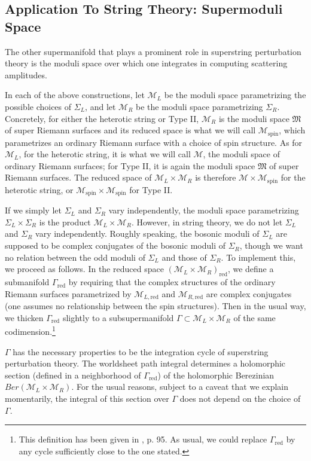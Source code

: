 \documentclass[11pt,a4paper]{article}
\def\SIgma{\Sigma}
\def\red{{\mathrm{red}}}
\def\spin{{\mathrm{spin}}}
\def\M{{\mathcal M}}
\def\MM{{\mathfrak M}}
\begin{document}
\subsection{Application To String Theory: Supermoduli Space}\label{applimoduli}

The other supermanifold that plays a prominent role in superstring perturbation theory is the moduli space over which one integrates
in computing scattering amplitudes.  

In each of the above constructions, let $\M_L$ be the moduli space parametrizing the possible choices of 
$\Sigma_L$, and let $\M_R$ be the moduli space parametrizing $\Sigma_R$.  Concretely, for either the heterotic string 
or Type II, $\M_R$ is the  moduli space $\MM$ of super Riemann surfaces
and its reduced space is what we will call $\M_\spin$, which parametrizes an ordinary Riemann surface with a choice
of spin structure.  As for $\M_L$, for the heterotic string, it is what we will call $\M$, the moduli space of ordinary
Riemann surfaces; for Type II, it is again the moduli space $\MM$ of super Riemann surfaces.  The reduced space
of $\M_L\times \M_R$ is therefore $\M\times \M_\spin$ for the heterotic string, or $\M_\spin\times \M_\spin$ for Type II.

If we simply let $\Sigma_L$ and $\SIgma_R$ vary independently, the moduli space
parametrizing  $\Sigma_L\times \SIgma_R$ is the product $\M_L\times \M_R$.  
However, in string theory, we do not let $\Sigma_L$ and $\Sigma_R$ vary independently.  Roughly speaking,
the bosonic moduli of $\Sigma_L$ are supposed to be complex conjugates of the bosonic moduli of $\SIgma_R$, though we want
no relation between the odd moduli of $\Sigma_L$ and those of $\Sigma_R$.
To implement this, we proceed as follows.  In the reduced space $(\M_L\times \M_R)_\red$,
we define a submanifold $\varGamma_\red$ by requiring that the complex structures of the ordinary Riemann surfaces
parametrized by $\M_{L,\red}$ and $\M_{R,\red}$ are complex conjugates (one assumes no relationship between the spin
structures).  Then in the usual way, we thicken $\varGamma_\red$ slightly to a subsupermanifold $\varGamma\subset \M_L\times 
\M_R$ of the same codimension.\footnote{This definition has been given in \cite{DEF}, p. 95.  As usual, we could replace
$\varGamma_\red$ by any cycle sufficiently close to the one stated.} 

$\varGamma$ has the necessary properties to be the integration cycle of superstring perturbation theory.  The worldsheet path integral determines
a holomorphic section (defined in a neighborhood
of  $\varGamma_\red$) of the holomorphic Berezinian $\mathit{Ber}(\M_L\times \M_R)$.  For the usual reasons, subject to a caveat that we explain momentarily, the integral of this section over $\varGamma$ does not depend on the choice of $\varGamma$.  
\end{document}
